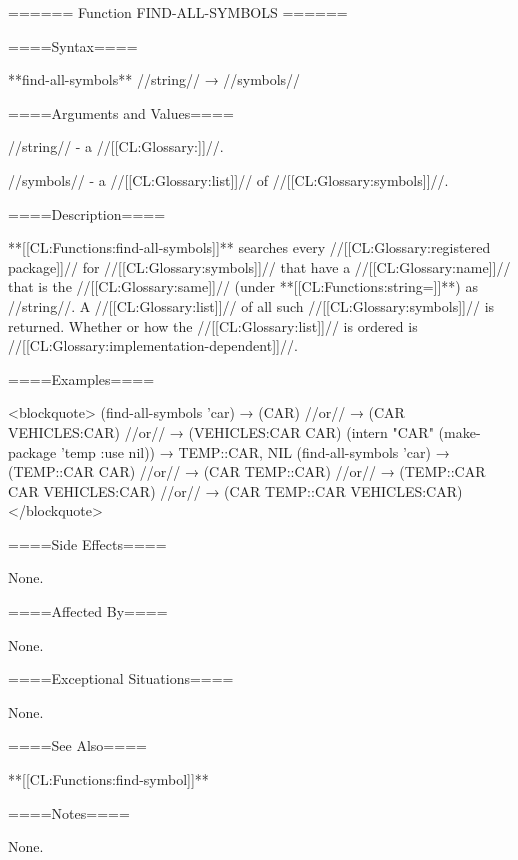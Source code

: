 ====== Function FIND-ALL-SYMBOLS ======

====Syntax====

**find-all-symbols** //string// → //symbols//

====Arguments and Values====

//string// - a //[[CL:Glossary:\symbolnamedesignator]]//.

//symbols// - a //[[CL:Glossary:list]]// of //[[CL:Glossary:symbols]]//.

====Description====

**[[CL:Functions:find-all-symbols]]** searches every //[[CL:Glossary:registered package]]// for //[[CL:Glossary:symbols]]// that have a //[[CL:Glossary:name]]// that is the //[[CL:Glossary:same]]// (under **[[CL:Functions:string=]]**) as //string//. A //[[CL:Glossary:list]]// of all such //[[CL:Glossary:symbols]]// is returned. Whether or how the //[[CL:Glossary:list]]// is ordered is //[[CL:Glossary:implementation-dependent]]//.

====Examples====

<blockquote> (find-all-symbols 'car) → (CAR) //or// → (CAR VEHICLES:CAR) //or// → (VEHICLES:CAR CAR) (intern "CAR" (make-package 'temp :use nil)) → TEMP::CAR, NIL (find-all-symbols 'car) → (TEMP::CAR CAR) //or// → (CAR TEMP::CAR) //or// → (TEMP::CAR CAR VEHICLES:CAR) //or// → (CAR TEMP::CAR VEHICLES:CAR) </blockquote>

====Side Effects====

None.

====Affected By====

None.

====Exceptional Situations====

None.

====See Also====

**[[CL:Functions:find-symbol]]**

====Notes====

None.

